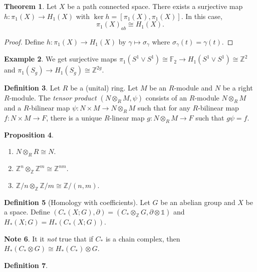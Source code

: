 \documentclass[10pt,letterpaper,cm]{nupset}
\theoremstyle{definition}
\newtheorem{definition}{Definition}[subsection]
\newtheorem{exmp}[definition]{Example}
\newtheorem{note}[definition]{Note}
\theoremstyle{theorem}
\newtheorem{theorem}[definition]{Theorem}
\newtheorem{prop}[definition]{Proposition}
\theoremstyle{remark}
\newcommand{\F}{\mathbb F}
\newcommand{\Z}{\mathbb Z}
\newcommand{\1}{\mathbb{1}}
\newcommand{\0}{\vec 0}
\begin{document}
\begin{theorem}
Let $X$ be a path connected space. There exists a surjective map $h: \pi_1(X) \to H_1(X)$ with $\ker{h} = [\pi_1(X), \pi_1(X)]$. In this case, $$\pi_1(X)_{ab} \cong H_1(X).$$
\end{theorem}
\begin{proof}
Define $h: \pi_1(X) \to H_1(X)$ by $\gamma \mapsto \sigma_{\gamma}$ where $\sigma_{\gamma}(t) = \gamma(t)$.  
\end{proof}

\begin{exmp}
We get surjective maps $\pi_1(S^1 \vee S^1) \cong \F_2 \to H_1(S^1 \vee S^1) \cong \Z^2$ and $\pi_1(S_g) \to H_1(S_g) \cong \Z^{2g}$.
\end{exmp}

\begin{definition}
Let $R$ be a (unital) ring. Let $M$ be an $R$-module and $N$ be a right $R$-module. The \textit{tensor product $(N \otimes_R M, \psi)$} consists of an $R$-module $N \otimes_R M$ and a $R$-bilinear map $\psi : N \times M \to N \otimes_R M$ such that for any $R$-bilinear map $f: N \times M \to F$, there is a unique $R$-linear map $g : N \otimes_R M \to F$ such that $g{\psi} = f$.
\end{definition}

\begin{prop} $ $
\begin{enumerate}
\item $N \otimes_R R \cong N$.
\item $\Z^n \otimes_{\Z} \Z^m \cong \Z^{nm}$.
\item $\Z/n \otimes_{\Z} \Z/m \cong \Z/ (n,m)$.
\end{enumerate}
\end{prop}

\begin{definition}[Homology with coefficients]
Let $G$ be an abelian group and $X$ be a space.  Define $(C_{\ast}(X; G), \partial) =(C_{\ast} \otimes_{\Z} G, \partial \otimes \1) $ and $H_{\ast}(X;G) = H_{\ast}(C_{\ast}(X;G))$.
\end{definition}

\begin{note}
It it \textit{not} true that if $C_{\ast}$ is a chain complex, then $H_{\ast}(C_{\ast} \otimes G) \cong H_{\ast}(C_{\ast}) \otimes G$.
\end{note}

\begin{definition}

\end{definition}
\end{document}
